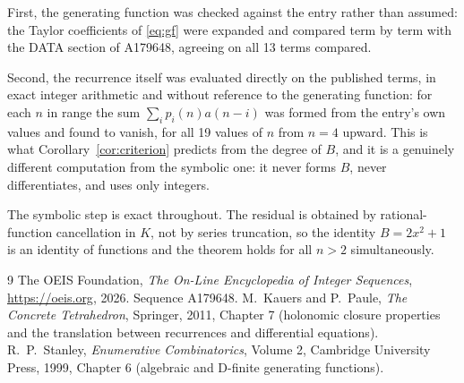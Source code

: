 \documentclass[11pt,a4paper]{article}
\theoremstyle{plain}
\theoremstyle{definition}
\begin{document}
First, the generating function was checked against the entry rather than assumed: the
Taylor coefficients of \eqref{eq:gf} were expanded and compared term by term with the DATA
section of A179648, agreeing on all 13 terms compared.

Second, the recurrence itself was evaluated directly on the published terms, in exact
integer arithmetic and without reference to the generating function: for each $n$ in range
the sum $\sum_{i}p_{i}(n)a(n-i)$ was formed from the entry's own values and found to
vanish, for all 19 values of $n$ from $n=4$ upward. This is what
Corollary~\ref{cor:criterion} predicts from the degree of $B$, and it is a genuinely
different computation from the symbolic one: it never forms $B$, never differentiates, and
uses only integers.

The symbolic step is exact throughout. The residual is obtained by rational-function
cancellation in $K$, not by series truncation, so the identity $B=2 x^{2} + 1$ is an
identity of functions and the theorem holds for all $n>2$ simultaneously.

\begin{thebibliography}{9}
 The OEIS Foundation, \emph{The On-Line Encyclopedia of Integer Sequences},
\url{https://oeis.org}, 2026. Sequence A179648.
 M.~Kauers and P.~Paule, \emph{The Concrete Tetrahedron}, Springer, 2011,
Chapter 7 (holonomic closure properties and the translation between recurrences and
differential equations).
 R.~P.~Stanley, \emph{Enumerative Combinatorics}, Volume 2, Cambridge
University Press, 1999, Chapter 6 (algebraic and D-finite generating functions).
\end{thebibliography}
\end{document}
